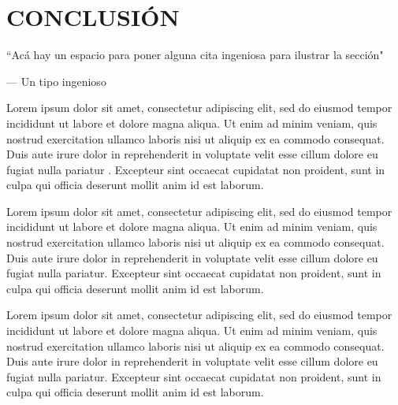 \documentclass[12pt]{article} %
\begin{document}
\clearpage



\section{CONCLUSIÓN}


\epigraph{``Acá hay un espacio para poner alguna cita ingeniosa para ilustrar la sección"}{--- \textup{Un tipo ingenioso}}



Lorem ipsum dolor sit amet, consectetur adipiscing elit, sed do eiusmod tempor incididunt ut labore et dolore magna aliqua. Ut enim ad minim veniam, quis nostrud exercitation ullamco laboris nisi ut aliquip ex ea commodo consequat. Duis aute irure dolor in reprehenderit \citep{ruiz_nicolini_juan_pablo_fuego_nodate} in voluptate velit esse cillum dolore eu fugiat nulla pariatur \citep{ruiz_nicolini_impacto_2017}. Excepteur sint occaecat cupidatat non proident, sunt in culpa qui officia deserunt mollit anim id est laborum.

Lorem ipsum dolor sit amet, consectetur adipiscing elit, sed do eiusmod tempor incididunt ut labore et dolore magna aliqua. Ut enim ad minim veniam, quis nostrud exercitation ullamco laboris nisi ut aliquip ex ea commodo consequat. Duis aute irure dolor in reprehenderit in voluptate velit esse cillum dolore eu fugiat nulla pariatur. Excepteur sint occaecat cupidatat non proident, sunt in culpa qui officia deserunt mollit anim id est laborum.

Lorem ipsum dolor sit amet, consectetur adipiscing elit, sed do eiusmod tempor incididunt ut labore et dolore magna aliqua. Ut enim ad minim veniam, quis nostrud exercitation ullamco laboris nisi ut aliquip ex ea commodo consequat. Duis aute irure dolor in reprehenderit in voluptate velit esse cillum dolore eu fugiat nulla pariatur. Excepteur sint occaecat cupidatat non proident, sunt in culpa qui officia deserunt mollit anim id est laborum.

\clearpage



 

\end{document}
